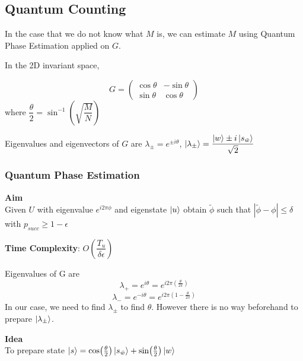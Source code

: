 \documentclass[11.5pt, paper=a4]{article}
\theoremstyle{definition}
\numberwithin{theorem}{section}
\begin{document}
\subsection{Quantum Counting}
In the case that we do not know what $M$ is, we can estimate $M$ using Quantum Phase Estimation applied on $G$.

\vspace{5mm}

In the 2D invariant space,

\begin{equation}
    G = \begin{pmatrix}
    \cos{\theta} & -\sin{\theta} \\
    \sin{\theta} & \cos{\theta}
    \end{pmatrix}
\end{equation}
where $\dfrac{\theta}{2} = \sin^{-1}(\sqrt{\dfrac{M}{N}})$


Eigenvalues and eigenvectors of $G$ are $\lambda_{\pm} = e^{\pm i \theta}$, $\ket{\lambda_{\pm}} = \dfrac{\ket{w} \pm i \ket{s_{\bar{w}}}}{\sqrt{2}}$

\subsubsection{Quantum Phase Estimation}

\textbf{Aim} \\
Given $U$ with eigenvalue $e^{i2 \pi \phi}$ and eigenstate $\ket{u}$ obtain $\tilde{\phi}$ such that $|\tilde{\phi} - \phi| \leq \delta$ with $p_{succ} \geq 1 - \epsilon$


\textbf{Time Complexity}: $O(\dfrac{T_u}{\delta \epsilon})$

\vspace{5mm}

Eigenvalues of G are
\begin{equation*}
    \lambda_{+} = e^{i \theta} = e^{i 2\pi (\frac{\theta}{2 \pi})}
\end{equation*}
\begin{equation*}
    \lambda_{-} = e^{-i \theta} = e^{i 2\pi (1 - \frac{\theta}{2 \pi})}
\end{equation*}
In our case, we need to find $\lambda_{\pm}$ to find $\theta$. However there is no way beforehand to prepare $\ket{\lambda_{\pm}}$.

\vspace{5mm}

\textbf{Idea} \\
To prepare state $\ket{s} = \cos(\frac{\theta}{2})\ket{s_{\bar{w}}} + \sin(\frac{\theta}{2})\ket{w}$
\end{document}
